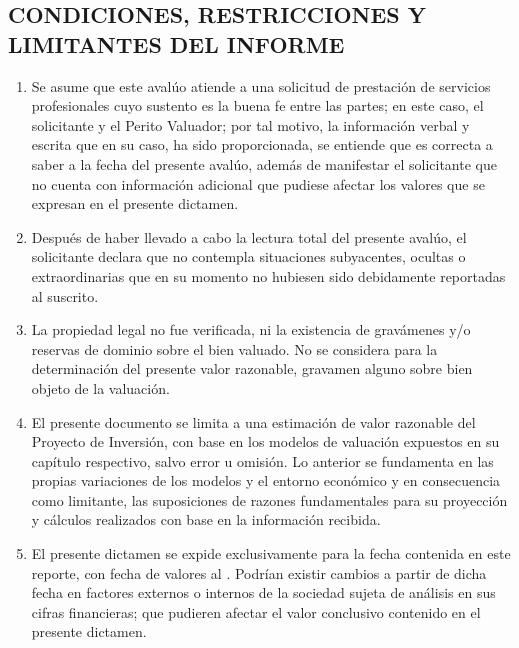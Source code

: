 \subsection{CONDICIONES, RESTRICCIONES Y LIMITANTES DEL INFORME}

\begin{enumerate}[\indent a)]

\item Se asume que este avalúo atiende a una solicitud de prestación de servicios profesionales cuyo sustento es la buena fe entre las partes; en este caso, el solicitante y el Perito Valuador; por tal motivo, la información verbal y escrita que en su caso, ha sido proporcionada, se entiende que es correcta a saber a la fecha del presente avalúo, además de manifestar el solicitante que no cuenta con información adicional  que pudiese afectar los valores que se expresan en el presente dictamen.

\item Después de haber llevado a cabo la lectura total del presente avalúo, el solicitante declara que no contempla situaciones subyacentes, ocultas o extraordinarias que en su momento no hubiesen sido debidamente reportadas al suscrito.

\item La propiedad legal no fue verificada, ni la existencia de gravámenes y/o reservas de dominio sobre el bien valuado. No se considera para la determinación del presente valor razonable, gravamen alguno sobre bien objeto de la valuación.

\item El presente documento se limita a una estimación de valor razonable del \textcolor{principal}{Proyecto de Inversión}, con base en los modelos de valuación expuestos en su capítulo respectivo, salvo error u omisión. Lo anterior se fundamenta en las propias variaciones de los modelos y el entorno económico y en consecuencia como limitante, las suposiciones de razones fundamentales para su proyección y cálculos realizados con base en la información recibida.


\item El presente dictamen se expide exclusivamente para la fecha contenida en este reporte, con fecha de valores  al \textcolor{principal}{\fechaValores}. Podrían existir cambios a partir de dicha fecha en factores externos o internos de la sociedad sujeta de análisis en sus cifras financieras; que pudieren afectar el valor conclusivo contenido en el presente dictamen.


\end{enumerate}
